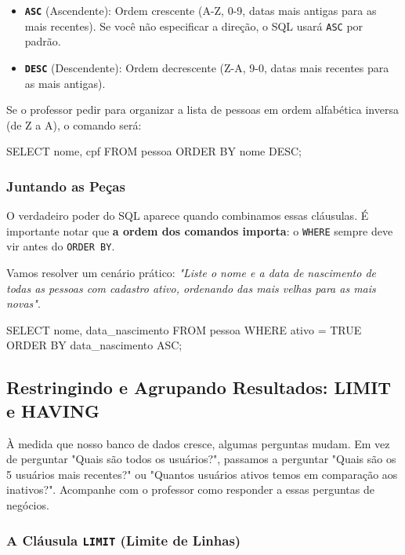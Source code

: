 \begin{itemize}
    \item \textbf{\texttt{ASC}} (Ascendente): Ordem crescente (A-Z, 0-9, datas mais antigas para as mais recentes). Se você não especificar a direção, o SQL usará \texttt{ASC} por padrão.
    \item \textbf{\texttt{DESC}} (Descendente): Ordem decrescente (Z-A, 9-0, datas mais recentes para as mais antigas).
\end{itemize}
Se o professor pedir para organizar a lista de pessoas em ordem alfabética inversa (de Z a A), o comando será:
\begin{sqlcode}
SELECT nome, cpf 
FROM pessoa 
ORDER BY nome DESC;
\end{sqlcode}

\subsubsection{Juntando as Peças}

O verdadeiro poder do SQL aparece quando combinamos essas cláusulas. É importante notar que \textbf{a ordem dos comandos importa}: o \texttt{WHERE} sempre deve vir antes do \texttt{ORDER BY}.

Vamos resolver um cenário prático: \textit{"Liste o nome e a data de nascimento de todas as pessoas com cadastro ativo, ordenando das mais velhas para as mais novas"}.

\begin{sqlcode}
SELECT nome, data_nascimento
FROM pessoa
WHERE ativo = TRUE
ORDER BY data_nascimento ASC;
\end{sqlcode}


\subsection{Restringindo e Agrupando Resultados: LIMIT e HAVING}

\begin{tcolorbox}[colback=blue!5,colframe=blue!40!black,title=Exercício Dirigido com o Professor: Top Resultados e Agrupamentos]
À medida que nosso banco de dados cresce, algumas perguntas mudam. Em vez de perguntar "Quais são todos os usuários?", passamos a perguntar "Quais são os 5 usuários mais recentes?" ou "Quantos usuários ativos temos em comparação aos inativos?". Acompanhe com o professor como responder a essas perguntas de negócios.
\end{tcolorbox}

\subsubsection{A Cláusula \texttt{LIMIT} (Limite de Linhas)}

